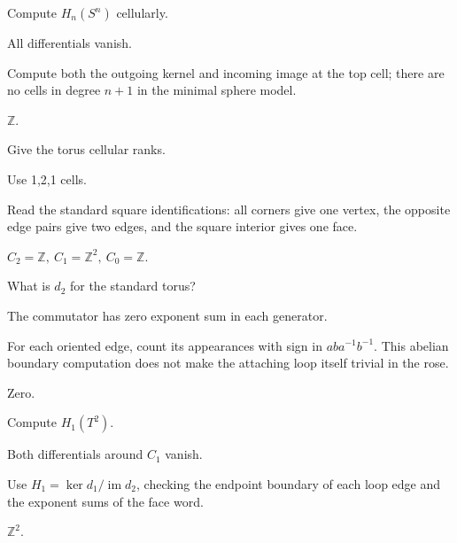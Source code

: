 \begin{exercise}\label{exr:viii18-06}
Compute \(H_n(S^n)\) cellularly.
\end{exercise}
\begin{hint}
All differentials vanish.

Compute both the outgoing kernel and incoming image at the top cell; there are no cells in degree \(n+1\) in the minimal sphere model.
\end{hint}
\begin{solution}
\(\mathbb Z\).
\end{solution}

\begin{exercise}\label{exr:viii18-07}
Give the torus cellular ranks.
\end{exercise}
\begin{hint}
Use 1,2,1 cells.

Read the standard square identifications: all corners give one vertex, the opposite edge pairs give two edges, and the square interior gives one face.
\end{hint}
\begin{solution}
\(C_2=\mathbb Z,\ C_1=\mathbb Z^2,\ C_0=\mathbb Z\).
\end{solution}

\begin{exercise}\label{exr:viii18-08}
What is \(d_2\) for the standard torus?
\end{exercise}
\begin{hint}
The commutator has zero exponent sum in each generator.

For each oriented edge, count its appearances with sign in \(aba^{-1}b^{-1}\). This abelian boundary computation does not make the attaching loop itself trivial in the rose.
\end{hint}
\begin{solution}
Zero.
\end{solution}

\begin{exercise}\label{exr:viii18-09}
Compute \(H_1(T^2)\).
\end{exercise}
\begin{hint}
Both differentials around \(C_1\) vanish.

Use \(H_1=\ker d_1/\operatorname{im}d_2\), checking the endpoint boundary of each loop edge and the exponent sums of the face word.
\end{hint}
\begin{solution}
\(\mathbb Z^2\).
\end{solution}


